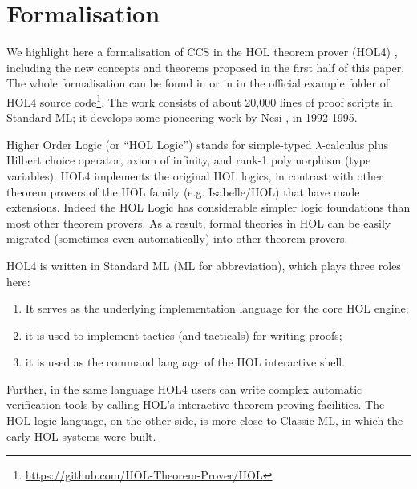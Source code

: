 \section{Formalisation}
\label{s:for}
We highlight here a formalisation of CCS
in the HOL theorem
prover (HOL4) \cite{slind2008brief},
including the new concepts and theorems proposed in the first half of
this paper.
The whole formalisation can be found 
in \cite{Tian:2017wrba}  or in 
 in the official example folder of HOL4 source
code\footnote{\url{https://github.com/HOL-Theorem-Prover/HOL}}. The
work consists of about 20,000 lines of proof scripts in Standard ML;
it develops
some pioneering work by Nesi \cite{Nesi:1992ve}, in
1992-1995. 

Higher Order Logic (or ``HOL Logic'') \cite{hollogic} stands for simple-typed $\lambda$-calculus plus Hilbert
choice operator, axiom of infinity, and rank-1 polymorphism (type
variables). HOL4 implements the original HOL logics, 
in contrast with 
 other theorem provers of the HOL family (e.g. Isabelle/HOL) that have
made extensions.
Indeed the HOL Logic has considerable simpler logic
foundations than most other theorem provers. %
As a result,
formal theories in HOL can be easily migrated (sometimes even
automatically) into other theorem provers.

HOL4 is written in Standard ML (ML for abbreviation), which plays three roles here:
\begin{enumerate}
\item It serves as the underlying implementation language for the core HOL engine;
\item it is used to implement tactics (and tacticals) for writing proofs;
\item it is used as the command language of the HOL interactive shell.
\end{enumerate}
Further, in the same language
 HOL4 users can write complex automatic
verification tools  by calling HOL's interactive theorem proving facilities.
\iflong
The HOL logic language, on the other
 side, is more close to Classic ML, in which the early HOL systems were built.
\fi


